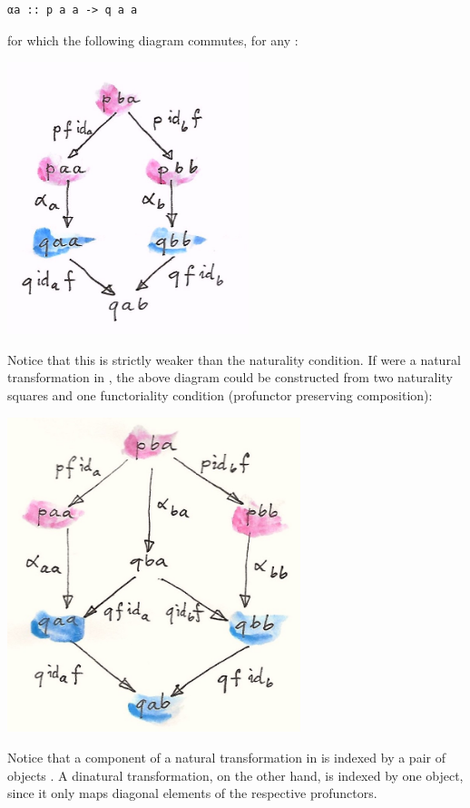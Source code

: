 \begin{verbatim}
αa :: p a a -> q a a
\end{verbatim}

for which the following diagram commutes, for any
:

\includegraphics[width=2.77083in]{images/end.jpg}

Notice that this is strictly weaker than the naturality condition. If
 were a natural transformation in
, the above diagram could be constructed
from two naturality squares and one functoriality condition (profunctor
 preserving composition):

\includegraphics[width=3.36458in]{images/end-1.jpg}

Notice that a component of a natural transformation  in
 is indexed by a pair of objects
. A dinatural transformation, on the other hand, is
indexed by one object, since it only maps diagonal elements of the
respective profunctors.

